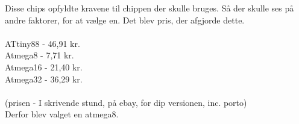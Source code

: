 \documentclass[Main]{subfiles}
\begin{document}
Disse chips opfyldte kravene til chippen der skulle bruges.
Så der skulle ses på andre faktorer, for at vælge en. 
Det blev pris, der afgjorde dette.\\\\
ATtiny88 - 46,91 kr.\\
Atmega8  - 7,71 kr.\\
Atmega16 - 21,40 kr.\\
Atmega32 - 36,29 kr.\\
\\(prisen - I skrivende stund, på ebay, for dip versionen, inc. porto)
\\Derfor blev valget en atmega8.
\end{document}
